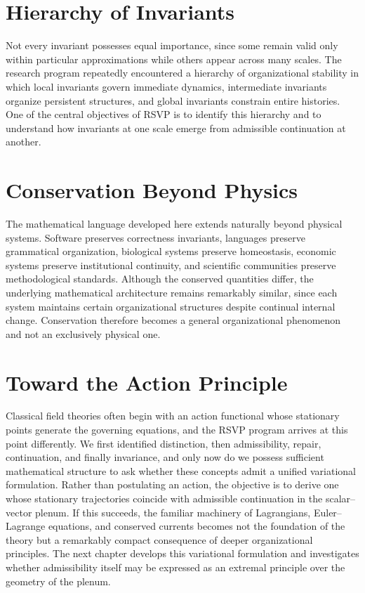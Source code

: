 \documentclass[11pt,oneside]{book}
\numberwithin{equation}{chapter}
\theoremstyle{definition}
\theoremstyle{plain}
\begin{document}
\section{Hierarchy of Invariants}

Not every invariant possesses equal importance, since some remain valid only within particular approximations while others appear across many scales. The research program repeatedly encountered a hierarchy of organizational stability in which local invariants govern immediate dynamics, intermediate invariants organize persistent structures, and global invariants constrain entire histories. One of the central objectives of RSVP is to identify this hierarchy and to understand how invariants at one scale emerge from admissible continuation at another.

\section{Conservation Beyond Physics}

The mathematical language developed here extends naturally beyond physical systems. Software preserves correctness invariants, languages preserve grammatical organization, biological systems preserve homeostasis, economic systems preserve institutional continuity, and scientific communities preserve methodological standards. Although the conserved quantities differ, the underlying mathematical architecture remains remarkably similar, since each system maintains certain organizational structures despite continual internal change. Conservation therefore becomes a general organizational phenomenon and not an exclusively physical one.

\section{Toward the Action Principle}

Classical field theories often begin with an action functional whose stationary points generate the governing equations, and the RSVP program arrives at this point differently. We first identified distinction, then admissibility, repair, continuation, and finally invariance, and only now do we possess sufficient mathematical structure to ask whether these concepts admit a unified variational formulation. Rather than postulating an action, the objective is to derive one whose stationary trajectories coincide with admissible continuation in the scalar--vector plenum. If this succeeds, the familiar machinery of Lagrangians, Euler--Lagrange equations, and conserved currents becomes not the foundation of the theory but a remarkably compact consequence of deeper organizational principles. The next chapter develops this variational formulation and investigates whether admissibility itself may be expressed as an extremal principle over the geometry of the plenum.
\end{document}
